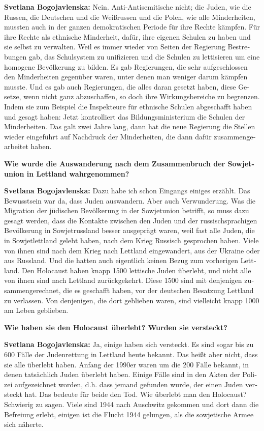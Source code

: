 \begin{otherlanguage}{ngerman}
\textbf{Svetlana Bogojavlenska:}  Nein. Anti-Antisemitische nicht; die Juden, wie die Russen, die Deutschen und die Weißrussen und die Polen, wie alle Minderheiten, mussten auch in der ganzen demokratischen Periode für ihre Rechte kämpfen. Für ihre Rechte als ethnische Minderheit, dafür, ihre eigenen Schulen zu haben und sie selbst zu verwalten. Weil es immer wieder von Seiten der Regierung Bestrebungen gab, das Schulsystem zu unifizieren und die Schulen zu lettisieren um eine homogene Bevölkerung zu bilden. Es gab Regierungen, die sehr aufgeschlossen den Minderheiten gegenüber waren, unter denen man weniger darum kämpfen musste. Und es gab auch Regierungen, die alles daran gesetzt haben, diese Gesetze, wenn nicht ganz abzuschaffen, so doch ihre Wirkungsbereiche zu begrenzen. Indem sie zum Beispiel die Inspekteure für ethnische Schulen abgeschafft haben und gesagt haben: Jetzt kontrolliert das Bildungsministerium die Schulen der Minderheiten. Das galt zwei Jahre lang, dann hat die neue Regierung die Stellen wieder eingeführt auf Nachdruck der Minderheiten, die dann dafür zusammengearbeitet haben.

\textbf{Wie wurde die Auswanderung nach dem Zusammenbruch der Sowjetunion in Lettland wahrgenommen?}

\textbf{Svetlana Bogojavlenska:}  Dazu habe ich schon Eingangs einiges erzählt. Das Bewusstsein war da, dass Juden auswandern. Aber auch Verwunderung. Was die Migration der jüdischen Bevölkerung in der Sowjetunion betrifft, so muss dazu gesagt werden, dass die Kontakte zwischen den Juden und der russischsprachigen Bevölkerung in Sowjetrussland besser ausgeprägt waren, weil fast alle Juden, die in Sowjetlettland gelebt haben, nach dem Krieg Russisch gesprochen haben. Viele von ihnen sind nach dem Krieg nach Lettland eingewandert, aus der Ukraine oder aus Russland. Und die hatten auch eigentlich keinen Bezug zum vorherigen Lettland. Den Holocaust haben knapp 1500 lettische Juden überlebt, und nicht alle von ihnen sind nach Lettland zurückgekehrt. Diese 1500 sind mit denjenigen zusammengerechnet, die es geschafft haben, vor der deutschen Besatzung Lettland zu verlassen. Von denjenigen, die dort geblieben waren, sind vielleicht knapp 1000 am Leben geblieben.

\textbf{Wie haben sie den Holocaust überlebt? Wurden sie versteckt?}

\textbf{Svetlana Bogojavlenska:} Ja, einige haben sich versteckt. Es sind sogar bis zu 600 Fälle der Judenrettung in Lettland heute bekannt. Das heißt aber nicht, dass sie alle überlebt haben. Anfang der 1990er waren um die 200 Fälle bekannt, in denen tatsächlich Juden überlebt haben. Einige Fälle sind in den Akten der Polizei aufgezeichnet worden, d.h. dass jemand gefunden wurde, der einen Juden versteckt hat. Das bedeute für beide den Tod. Wie überlebt man den Holocaust? Schwierig zu sagen. Viele sind 1944 nach Auschwitz gekommen und dort dann die Befreiung erlebt, einigen ist die Flucht 1944 gelungen, als die sowjetische Armee sich näherte.


\end{otherlanguage}
